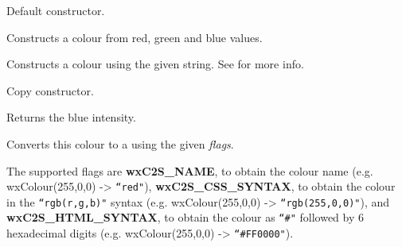 Default constructor.


Constructs a colour from red, green and blue values.


Constructs a colour using the given string. See  for more info.


Copy constructor.












\label{wxcolourblue}


Returns the blue intensity.


\label{wxcolourgetasstring}


Converts this colour to a 
using the given {\it flags}.

The supported flags are {\bf wxC2S_NAME}, to obtain the colour
name (e.g. wxColour(255,0,0) -> \texttt{``red"}), {\bf wxC2S_CSS_SYNTAX}, to obtain
the colour in the \texttt{``rgb(r,g,b)"} syntax
(e.g. wxColour(255,0,0) -> \texttt{``rgb(255,0,0)"}), and {\bf wxC2S_HTML_SYNTAX}, to obtain
the colour as  \texttt{``\#"} followed by 6 hexadecimal digits
(e.g. wxColour(255,0,0) -> \texttt{``\#FF0000"}).

